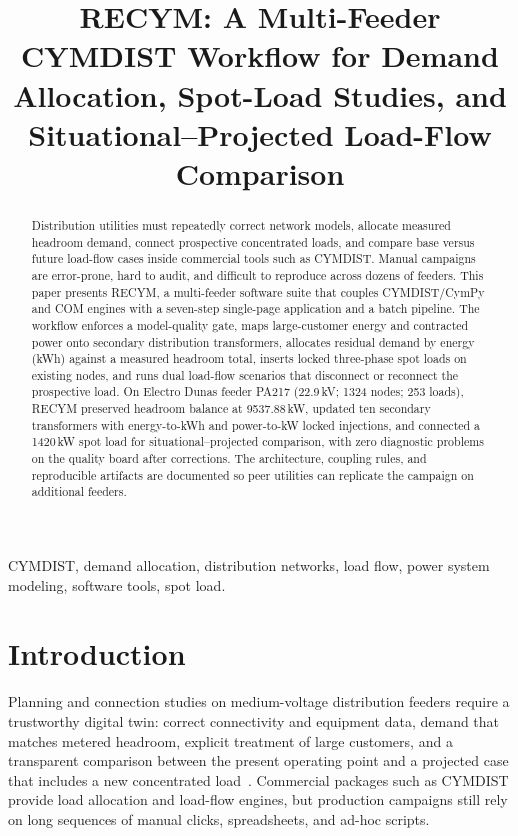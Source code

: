\documentclass[journal]{IEEEtran}
\begin{document}
\title{RECYM: A Multi-Feeder CYMDIST Workflow for Demand Allocation,
Spot-Load Studies, and Situational--Projected Load-Flow Comparison}

\author{
}

\maketitle

\begin{abstract}
Distribution utilities must repeatedly correct network models, allocate measured
headroom demand, connect prospective concentrated loads, and compare base versus
future load-flow cases inside commercial tools such as CYMDIST. Manual campaigns
are error-prone, hard to audit, and difficult to reproduce across dozens of
feeders. This paper presents RECYM, a multi-feeder software suite that couples
CYMDIST/CymPy and COM engines with a seven-step single-page application and a
batch pipeline. The workflow enforces a model-quality gate, maps large-customer
energy and contracted power onto secondary distribution transformers, allocates
residual demand by energy (kWh) against a measured headroom total, inserts locked
three-phase spot loads on existing nodes, and runs dual load-flow scenarios that
disconnect or reconnect the prospective load. On Electro Dunas feeder PA217
(22.9\,kV; 1324 nodes; 253 loads), RECYM preserved headroom balance at
9537.88\,kW, updated ten secondary transformers with energy-to-kWh and
power-to-kW locked injections, and connected a 1420\,kW spot load for
situational--projected comparison, with zero diagnostic problems on the quality
board after corrections. The architecture, coupling rules, and reproducible
artifacts are documented so peer utilities can replicate the campaign on
additional feeders.
\end{abstract}

\begin{IEEEkeywords}
CYMDIST, demand allocation, distribution networks, load flow,
power system modeling, software tools, spot load.
\end{IEEEkeywords}

\section{Introduction}
Planning and connection studies on medium-voltage distribution feeders require a
trustworthy digital twin: correct connectivity and equipment data, demand that
matches metered headroom, explicit treatment of large customers, and a transparent
comparison between the present operating point and a projected case that includes
a new concentrated load~\cite{kersting2017,gonen2014}.
Commercial packages such as CYMDIST provide load allocation and load-flow
engines, but production campaigns still rely on long sequences of manual clicks,
spreadsheets, and ad-hoc scripts.
\end{document}
